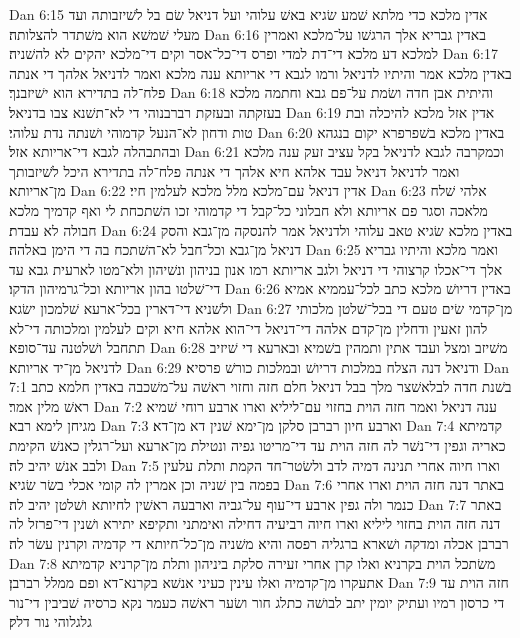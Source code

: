 Dan 6:15  אדין מלכא כדי מלתא שׁמע שׂגיא באשׁ עלוהי ועל דניאל שׂם בל לשׁיזבותה ועד מעלי שׁמשׁא הוא משׁתדר להצלותה׃
Dan 6:16  באדין גבריא אלך הרגשׁו על־מלכא ואמרין למלכא דע מלכא די־דת למדי ופרס די־כל־אסר וקים די־מלכא יהקים לא להשׁניה׃
Dan 6:17  באדין מלכא אמר והיתיו לדניאל ורמו לגבא די אריותא ענה מלכא ואמר לדניאל אלהך די אנתה פלח־לה בתדירא הוא ישׁיזבנך׃
Dan 6:18  והיתית אבן חדה ושׂמת על־פם גבא וחתמה מלכא בעזקתה ובעזקת רברבנוהי די לא־תשׁנא צבו בדניאל׃
Dan 6:19  אדין אזל מלכא להיכלה ובת טות ודחון לא־הנעל קדמוהי ושׁנתה נדת עלוהי׃
Dan 6:20  באדין מלכא בשׁפרפרא יקום בנגהא ובהתבהלה לגבא די־אריותא אזל׃
Dan 6:21  וכמקרבה לגבא לדניאל בקל עציב זעק ענה מלכא ואמר לדניאל דניאל עבד אלהא חיא אלהך די אנתה פלח־לה בתדירא היכל לשׁיזבותך מן־אריותא׃
Dan 6:22  אדין דניאל עם־מלכא מלל מלכא לעלמין חיי׃
Dan 6:23  אלהי שׁלח מלאכה וסגר פם אריותא ולא חבלוני כל־קבל די קדמוהי זכו השׁתכחת לי ואף קדמיך מלכא חבולה לא עבדת׃
Dan 6:24  באדין מלכא שׂגיא טאב עלוהי ולדניאל אמר להנסקה מן־גבא והסק דניאל מן־גבא וכל־חבל לא־השׁתכח בה די הימן באלהה׃
Dan 6:25  ואמר מלכא והיתיו גבריא אלך די־אכלו קרצוהי די דניאל ולגב אריותא רמו אנון בניהון ונשׁיהון ולא־מטו לארעית גבא עד די־שׁלטו בהון אריותא וכל־גרמיהון הדקו׃
Dan 6:26  באדין דריושׁ מלכא כתב לכל־עממיא אמיא ולשׁניא די־דארין בכל־ארעא שׁלמכון ישׂגא׃
Dan 6:27  מן־קדמי שׂים טעם די בכל־שׁלטן מלכותי להון זאעין ודחלין מן־קדם אלהה די־דניאל די־הוא אלהא חיא וקים לעלמין ומלכותה די־לא תתחבל ושׁלטנה עד־סופא׃
Dan 6:28  משׁיזב ומצל ועבד אתין ותמהין בשׁמיא ובארעא די שׁיזיב לדניאל מן־יד אריותא׃
Dan 6:29  ודניאל דנה הצלח במלכות דריושׁ ובמלכות כורשׁ פרסיא׃
Dan 7:1  בשׁנת חדה לבלאשׁצר מלך בבל דניאל חלם חזה וחזוי ראשׁה על־משׁכבה באדין חלמא כתב ראשׁ מלין אמר׃
Dan 7:2  ענה דניאל ואמר חזה הוית בחזוי עם־ליליא וארו ארבע רוחי שׁמיא מגיחן לימא רבא׃
Dan 7:3  וארבע חיון רברבן סלקן מן־ימא שׁנין דא מן־דא׃
Dan 7:4  קדמיתא כאריה וגפין די־נשׁר לה חזה הוית עד די־מריטו גפיה ונטילת מן־ארעא ועל־רגלין כאנשׁ הקימת ולבב אנשׁ יהיב לה׃
Dan 7:5  וארו חיוה אחרי תנינה דמיה לדב ולשׂטר־חד הקמת ותלת עלעין בפמה בין שׁניה וכן אמרין לה קומי אכלי בשׂר שׂגיא׃
Dan 7:6  באתר דנה חזה הוית וארו אחרי כנמר ולה גפין ארבע די־עוף על־גביה וארבעה ראשׁין לחיותא ושׁלטן יהיב לה׃
Dan 7:7  באתר דנה חזה הוית בחזוי ליליא וארו חיוה רביעיה דחילה ואימתני ותקיפא יתירא ושׁנין די־פרזל לה רברבן אכלה ומדקה ושׁארא ברגליה רפסה והיא משׁניה מן־כל־חיותא די קדמיה וקרנין עשׂר לה׃
Dan 7:8  משׂתכל הוית בקרניא ואלו קרן אחרי זעירה סלקת ביניהון ותלת מן־קרניא קדמיתא אתעקרו מן־קדמיה ואלו עינין כעיני אנשׁא בקרנא־דא ופם ממלל רברבן׃
Dan 7:9  חזה הוית עד די כרסון רמיו ועתיק יומין יתב לבושׁה כתלג חור ושׂער ראשׁה כעמר נקא כרסיה שׁביבין די־נור גלגלוהי נור דלק׃
